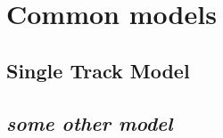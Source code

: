 \chapter{Common models}
\label{chap:stateoftheart}
\section{Single Track Model}
\label{sec:singletrack}
\section{\textit{some other model}}
\label{sec:modeltwo}
